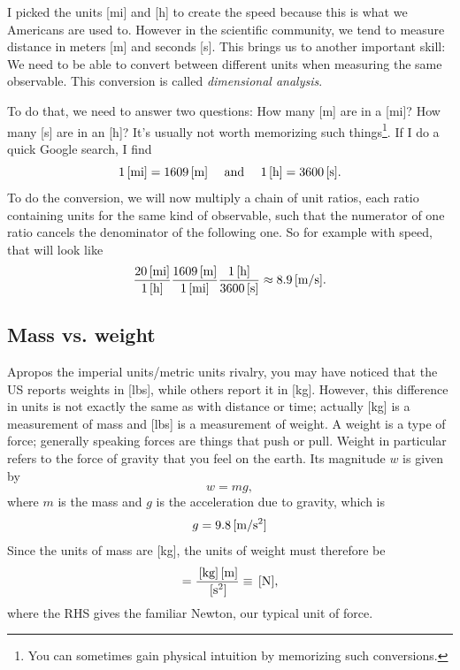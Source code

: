I picked the units [mi] and [h] to create the speed because this is what we Americans 
are used to. However in the scientific community, we tend to measure distance in 
meters [m] and seconds [s]. This brings us to another important skill: We need to be 
able to convert between different units when measuring the same observable.
This conversion is called {\it dimensional analysis}.

To do that, we need to answer two questions: How many [m] are in a [mi]? How many [s] 
are in an [h]? It’s usually not worth memorizing such things\footnote{You can
sometimes gain physical intuition by memorizing such conversions.}.
If I do a quick Google search, I find
\begin{equation}
1\,[\text{mi}]=1609\,[\text{m}]~~~~\text{and}~~~~1\,[\text{h}]=3600\,[\text{s}].
\end{equation}
To do the conversion, we will now multiply a chain of unit ratios, each ratio containing 
units for the same kind of observable, such that the numerator of one ratio cancels 
the denominator of the following one. So for example with speed, that will look like
\begin{equation}
\frac{20\,[\text{mi}]}{1\,[\text{h}]}
\frac{1609\,[\text{m}]}{1\,[\text{mi}]}
\frac{1\,[\text{h}]}{3600\,[\text{s}]}
\approx8.9\,[\text{m/s}].
\end{equation}

\subsection{Mass vs. weight}
Apropos the imperial units/metric units rivalry, you may have noticed that the US reports 
weights in [lbs], while others report it in [kg]. However, this difference in units is not 
exactly the same as with distance or time; actually [kg] is a measurement of mass 
and [lbs] is a measurement of weight. A weight is a type of force; generally speaking 
forces are things that push or pull. Weight in particular refers to the force of 
gravity that you feel on the earth. Its magnitude $w$ is given by
\begin{equation}\label{eq:weightMass}
w=mg,
\end{equation}
where $m$ is the mass and $g$ is the acceleration due to gravity, which is
\begin{equation}
g=9.8\,[\text{m/s$^2$}]
\end{equation}
Since the units of mass are [kg], the units of weight must therefore be
\begin{equation}
[w]=\frac{\units{kg}\units{m}}{\units{s$^2$}}\equiv\units{N},
\end{equation}
where the RHS gives the familiar Newton, our typical unit of force.

